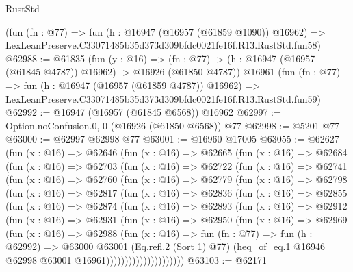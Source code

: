 \begin{lexlean}{RustStd}
\begin{coremodule}
    (fun (fn : @77) =>
    fun (h : @16947 (@16957 (@61859 @1090)) @16962) =>
    LexLeanPreserve.C33071485b35d373d309bfdc0021fe16f.R13.RustStd.fun58)
@62988 := @61835
    (fun (y : @16) =>
    (fn : @77) -> (h : @16947 (@16957 (@61845 @4787)) @16962) -> @16926 (@61850 @4787))
    @16961
    (fun (fn : @77) =>
    fun (h : @16947 (@16957 (@61859 @4787)) @16962) =>
    LexLeanPreserve.C33071485b35d373d309bfdc0021fe16f.R13.RustStd.fun59)
@62992 := @16947 (@16957 (@61845 @6568)) @16962
@62997 := Option.noConfusion.{0, 0} (@16926 (@61850 @6568)) @77
@62998 := @5201 @77
@63000 := @62997 @62998 @77
@63001 := @16960 @17005
@63055 := @62627
    (fun (x : @16) =>
    @62646
      (fun (x : @16) =>
      @62665
        (fun (x : @16) =>
        @62684
          (fun (x : @16) =>
          @62703
            (fun (x : @16) =>
            @62722
              (fun (x : @16) =>
              @62741
                (fun (x : @16) =>
                @62760
                  (fun (x : @16) =>
                  @62779
                    (fun (x : @16) =>
                    @62798
                      (fun (x : @16) =>
                      @62817
                        (fun (x : @16) =>
                        @62836
                          (fun (x : @16) =>
                          @62855
                            (fun (x : @16) =>
                            @62874
                              (fun (x : @16) =>
                              @62893
                                (fun (x : @16) =>
                                @62912
                                  (fun (x : @16) =>
                                  @62931
                                    (fun (x : @16) =>
                                    @62950
                                      (fun (x : @16) =>
                                      @62969
                                        (fun (x : @16) =>
                                        @62988
                                          (fun (x : @16) =>
                                          fun (fn : @77) =>
                                          fun (h : @62992) =>
                                          @63000
                                            @63001
                                            (Eq.refl.{2} (Sort 1) @77)
                                            (heq_of_eq.{1}
                                              @16946
                                              @62998
                                              @63001
                                              @16961)))))))))))))))))))))
@63103 := @62171

\end{coremodule}
\end{lexlean}
